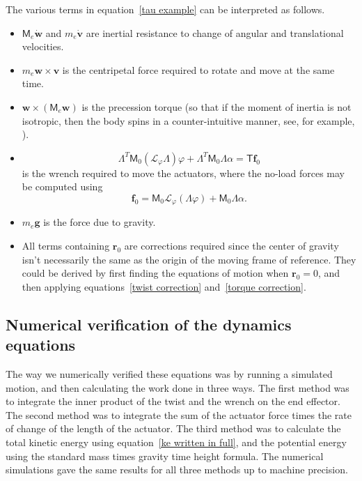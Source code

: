 \documentclass[reqno,12pt]{amsart}
\newcommand{\liederiv}{\mathcal L}
\begin{document}
The various terms in equation~\eqref{tau example} can be interpreted as follows.
\begin{itemize}
\item $\mathsf M_e \dot{\bm w}$ and $m_e \dot{\bm v}$ are inertial resistance to change of angular and translational velocities.
\item $m_e \bm w \times \bm v$ is the centripetal force required to rotate and move at the same time.
\item $\bm w \times (\mathsf M_e \bm w)$ is the precession torque (so that if the moment of inertia is not isotropic, then the body spins in a counter-intuitive manner, see, for example, \cite{kawano-et-al}).
\item
\begin{equation}
\mathsf \Lambda^T \mathsf M_0 (\liederiv_\varphi \mathsf \Lambda) \varphi + \mathsf\Lambda^T \mathsf M_0 \mathsf \Lambda \alpha = \mathsf T \bm f_0
\end{equation}
is the wrench required to move the actuators, where the no-load forces may be computed using
\begin{equation}
\bm f_0 = \mathsf M_0 \liederiv_\varphi(\mathsf\Lambda \varphi) + \mathsf M_0 \mathsf\Lambda \alpha .
\end{equation}
\item $m_e \bm g$ is the force due to gravity.
\item All terms containing $\bm r_0$ are corrections required since the center of gravity isn't necessarily the same as the origin of the moving frame of reference.  They could be derived by first finding the equations of motion when $\bm r_0 = 0$, and then applying equations~\eqref{twist correction} and~\eqref{torque correction}.
\end{itemize}

\subsection{Numerical verification of the dynamics equations}

The way we numerically verified these equations was by running a simulated motion, and then calculating the work done in three ways.  The first method was to integrate the inner product of the twist and the wrench on the end effector.  The second method was to integrate the sum of the actuator force times the rate of change of the length of the actuator.  The third method was to calculate the total kinetic energy using equation~\eqref{ke written in full}, and the potential energy using the standard mass times gravity time height formula.  The numerical simulations gave the same results for all three methods up to machine precision.
\end{document}
